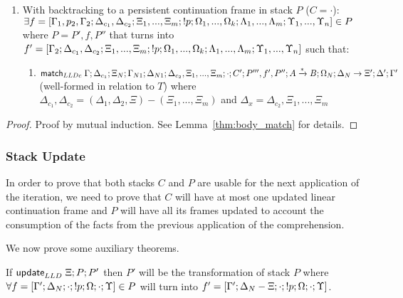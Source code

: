 \begin{lemma}
\begin{enumerate}
\begin{enumerate}
      
      \item With backtracking to a persistent continuation frame in stack $P$ ($C = \cdot$):\\
      $\exists f = [\Gamma_1, p_2, \Gamma_2; \Delta_{c_1}, \Delta_{c_2}; \Xi_1, ..., \Xi_m; {!} p; \Omega_1, ..., \Omega_k; \Lambda_1, ..., \Lambda_m; \Upsilon_1, ..., \Upsilon_n] \in P$ where $P = P', f, P''$ that turns into $f' = [\Gamma_2; \Delta_{c_1}, \Delta_{c_2}; \Xi_1, ..., \Xi_m; {!} p; \Omega_1, ..., \Omega_k; \Lambda_1, ..., \Lambda_m; \Upsilon_1, ..., \Upsilon_n]$ such that:
         \begin{enumerate}
            \item $\mathsf{match}_{LLDc} \; \Gamma; \Delta_{c_1}; \Xi_N; \Gamma_{N1}; \Delta_{N1}; \Delta_{c_2}, \Xi_1, ..., \Xi_m; \cdot; C'; P''', f', P''; A \xrightarrow{*} B; \Omega_N; \Delta_N \rightarrow \Xi'; \Delta'; \Gamma'$ (well-formed in relation to $T$) where $\Delta_{c_1}, \Delta_{c_2} = (\Delta_1, \Delta_2, \Xi) - (\Xi_1, ..., \Xi_m)$ and $\Delta_x = \Delta_{c_2}, \Xi_1, ..., \Xi_m$
         \end{enumerate}
   \end{enumerate}
\end{enumerate}
\end{lemma}
\begin{proof}
Proof by mutual induction. See Lemma~\ref{thm:body_match} for details.
\end{proof}

\subsubsection{Stack Update}

In order to prove that both stacks $C$ and $P$ are usable for the next application of the iteration,
we need to prove that $C$ will have at most one updated linear continuation frame and $P$ will have
all its frames updated to account the consumption of the facts from the previous application of the
comprehension.

We now prove some auxiliary theorems.

\begin{theorem}\label{thm:stack_update}
If $\mathsf{update}_{LLD} \; \Xi; P; P'$ then $P'$ will be the transformation of stack $P$ where $\forall f = [\Gamma'; \Delta_N; \cdot; {!} p; \Omega; \cdot; \Upsilon] \in P$ will turn into $f' = [\Gamma'; \Delta_N - \Xi; \cdot; {!} p; \Omega; \cdot; \Upsilon]$.
\end{theorem}

